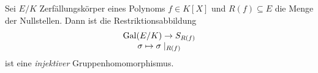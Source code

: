 \begin{lemma}
	Sei $E / K$ Zerfällungskörper eines Polynoms $f \in K[X]$ und $R(f) \subseteq E$ die Menge der Nullstellen.
	Dann ist die Restriktionsabbildung 
	\[
		\begin{array}{c} \operatorname{Gal}(E / K) \to S_{R(f)}\\ \sigma \mapsto  \sigma \mid_{R(f)}\\ \end{array}
	\] 
	ist eine \emph{injektiver} Gruppenhomomorphismus.
\end{lemma}


























